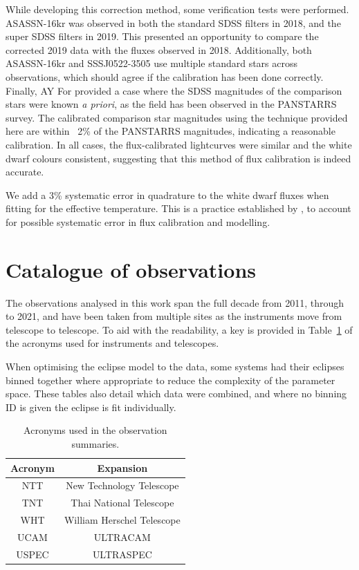 While developing this correction method, some verification tests were performed.
ASASSN-16kr was observed in both the standard SDSS filters in 2018, and the super SDSS filters in 2019. This presented an opportunity to compare the corrected 2019 data with the fluxes observed in 2018. Additionally, both ASASSN-16kr and SSSJ0522-3505 use multiple standard stars across observations, which should agree if the calibration has been done correctly. Finally, AY For provided a case where the SDSS magnitudes of the comparison stars were known {\it a priori}, as the field has been observed in the PANSTARRS survey. The calibrated comparison star magnitudes using the technique provided here are within ~2\% of the PANSTARRS magnitudes, indicating a reasonable calibration. In all cases, the flux-calibrated lightcurves were similar and the white dwarf colours consistent, suggesting that this method of flux calibration is indeed accurate.

We add a 3\% systematic error in quadrature to the white dwarf fluxes when fitting for the effective temperature. This is a practice established by \citet{McAllister2019}, to account for possible systematic error in flux calibration and modelling.

\newpage
\section{Catalogue of observations}
\label{sect:observing:observation catalogue}

The observations analysed in this work span the full decade from 2011, through to 2021, and have been taken from multiple sites as the instruments move from telescope to telescope. To aid with the readability, a key is provided in Table~\ref{tab:observation acronyms} of the acronyms used for instruments and telescopes.

When optimising the eclipse model to the data, some systems had their eclipses binned together where appropriate to reduce the complexity of the parameter space.
These tables also detail which data were combined, and where no binning ID is given the eclipse is fit individually.

\begin{table}
    \centering
    \begin{tabular}{c|c}
        Acronym & Expansion \\
        \hline
        NTT & New Technology Telescope \\
        TNT & Thai National Telescope \\
        WHT & William Herschel Telescope \\
        UCAM & ULTRACAM \\
        USPEC & ULTRASPEC \\
    \end{tabular}
    \caption{Acronyms used in the observation summaries.}
    \label{tab:observation acronyms}
\end{table}



